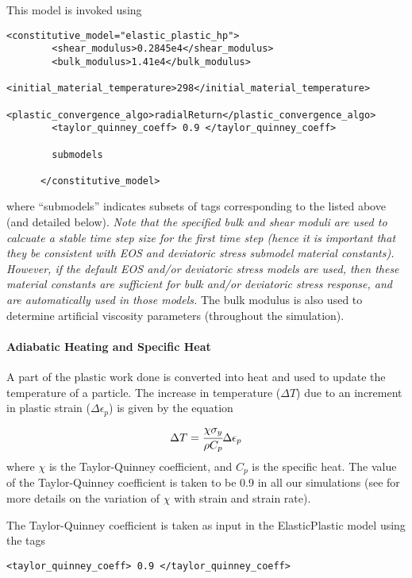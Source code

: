 This model is invoked using
  \begin{Verbatim}[fontsize=\footnotesize]  
      <constitutive_model="elastic_plastic_hp">
        <shear_modulus>0.2845e4</shear_modulus>
        <bulk_modulus>1.41e4</bulk_modulus>
        <initial_material_temperature>298</initial_material_temperature>
        <plastic_convergence_algo>radialReturn</plastic_convergence_algo>
        <taylor_quinney_coeff> 0.9 </taylor_quinney_coeff>

        submodels

      </constitutive_model>
  \end{Verbatim}
  where ``submodels'' indicates subsets of tags corresponding to the
  listed above (and detailed below).  {\it Note that the specified
    bulk and shear moduli are used to calcuate a stable time step size
    for the first time step (hence it is important that they be
    consistent with EOS and deviatoric stress submodel material
    constants).  However, if the default EOS and/or deviatoric stress
    models are used, then these material constants are sufficient for
    bulk and/or deviatoric stress response, and are automatically used
    in those models.}  The bulk modulus is also used to determine
  artificial viscosity parameters (throughout the simulation).

  \paragraph{Adiabatic Heating and Specific Heat}
  A part of the plastic work done is converted into heat and used to update the
  temperature of a particle.  The increase in temperature ($\Delta T$) due to
  an increment in plastic strain ($\Delta\epsilon_p$) is given by the equation
  \begin{equation}
    \Delta T = \cfrac{\chi\sigma_y}{\rho C_p} \Delta \epsilon_p
  \end{equation}
  where $\chi$ is the Taylor-Quinney coefficient, and $C_p$ is the specific
  heat.  The value of the Taylor-Quinney coefficient is taken to be 0.9
  in all our simulations (see \cite{Ravi01} for more details on the
  variation of $\chi$ with strain and strain rate).

  The Taylor-Quinney coefficient is taken as input in the ElasticPlastic model
  using the tags
  \begin{Verbatim}[fontsize=\footnotesize]
    <taylor_quinney_coeff> 0.9 </taylor_quinney_coeff>
  \end{Verbatim}

